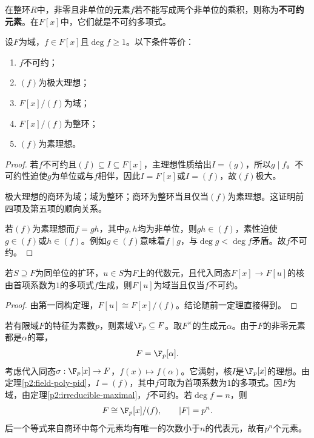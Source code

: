 \begin{definition}
在整环$R$中，非零且非单位的元素$f$若不能写成两个非单位的乘积，则称为\textbf{不可约元素}。在$F[x]$中，它们就是不可约多项式。
\end{definition}
\begin{theorem}\label{p2:irreducible-maximal}
设$F$为域，$f\in F[x]$且$\deg f\geq1$。以下条件等价：
\begin{enumerate}
\item $f$不可约；
\item $(f)$为极大理想；
\item $F[x]/(f)$为域；
\item $F[x]/(f)$为整环；
\item $(f)$为素理想。
\end{enumerate}
\end{theorem}
\begin{proof}
若$f$不可约且$(f)\subseteq I\subseteq F[x]$，主理想性质给出$I=(g)$，所以$g\mid f$。不可约性迫使$g$为单位或与$f$相伴，因此$I=F[x]$或$I=(f)$，故$(f)$极大。

极大理想的商环为域；域为整环；商环为整环当且仅当$(f)$为素理想。这证明前四项及第五项的顺向关系。

若$(f)$为素理想而$f=gh$，其中$g,h$均为非单位，则$gh\in(f)$，素性迫使$g\in(f)$或$h\in(f)$。例如$g\in(f)$意味着$f\mid g$，与$\deg g<\deg f$矛盾。故$f$不可约。
\end{proof}

\begin{corollary}
若$S\supseteq F$为同单位的扩环，$u\in S$为$F$上的代数元，且代入同态$F[x]\to F[u]$的核由首项系数为$1$的多项式$f$生成，则$F[u]$为域当且仅当$f$不可约。
\end{corollary}
\begin{proof}
由第一同构定理，$F[u]\cong F[x]/(f)$。结论随前一定理直接得到。
\end{proof}

\begin{example}
若有限域$F$的特征为素数$p$，则素域$\F_p\subseteq F$。取$F^\times$的生成元$\alpha$。由于$F$的非零元素都是$\alpha$的幂，
\[
F=\F_p[\alpha].
\]
考虑代入同态$\sigma:\F_p[x]\to F$，$f(x)\mapsto f(\alpha)$。它满射，核$I$是$\F_p[x]$的理想。由定理\ref{p2:field-poly-pid}，$I=(f)$，其中$f$可取为首项系数为$1$的多项式。因$F$为域，由定理\ref{p2:irreducible-maximal}，$f$不可约。若$\deg f=n$，则
\[
F\cong\F_p[x]/(f),\qquad |F|=p^n.
\]
后一个等式来自商环中每个元素均有唯一的次数小于$n$的代表元，故有$p^n$个元素。
\end{example}

